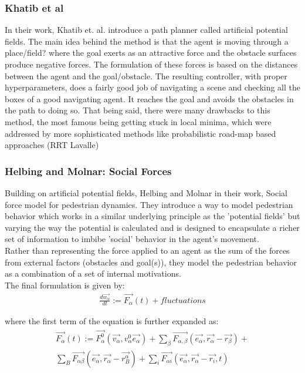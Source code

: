 \subsubsection*{Khatib et al}
In their work, Khatib et. al. introduce a path planner called artificial potential fields. The main idea behind the method is that the agent is moving through a place/field? where the goal exerts as an attractive force and the obstacle surfaces produce negative forces. The formulation of these forces is based on the distances between the agent and the goal/obstacle. The resulting controller, with proper hyperparameters, does a fairly good job of navigating a scene and checking all the boxes of a good navigating agent. It reaches the goal and avoids the obstacles in the path to doing so. That being said, there were many drawbacks to this method, the most famous being getting stuck in local minima, which were addressed by more sophisticated methods like probabilistic road-map based approaches (RRT Lavalle)
\subsubsection*{Helbing and Molnar: Social Forces}

Building on artificial potential fields, Helbing and Molnar in their work, Social force model for pedestrian dynamics. They introduce a way to model pedestrian behavior which works in a similar underlying principle as the 'potential fields' but varying the way the potential is calculated and is designed to encapsulate a richer set of information to imbibe 'social' behavior in the agent's movement.\\

Rather than representing the force applied to an agent as the sum of the forces from external factors (obstacles and goal(s)), they model the pedestrian behavior as a combination of a set of internal motivations.\\

The final formulation is given by:
\begin{align}
\frac{d\vec{w_{\alpha}}}{dt}:=\vec{F_{\alpha}}(t)+fluctuations
\end{align}

where the first term of the equation is further expanded as:\\

\begin{multline}
\vec{F_{\alpha}}(t):=
\vec{F_{\alpha}^{0}}(\vec{v_{\alpha}}, v_{\alpha}^{0}\vec{e_{\alpha}})+\sum_{\beta}\vec{F_{\alpha, \beta}}(\vec{e_{\alpha}}, \vec{r_{\alpha}} - \vec{r_{\beta}})
+\\\sum_{B}\vec{F_{\alpha\beta}}(\vec{e_{\alpha}}, \vec{r_{\alpha}} - \vec{r_{B}^{\alpha}}) + \sum_{i}\vec{F_{\alpha i}}(\vec{e_{\alpha}}, \vec{r_{\alpha}}-\vec{r_i},t)
\end{multline}

